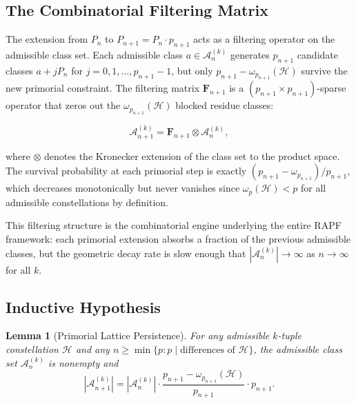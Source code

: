 \documentclass[11pt]{article}
\newtheorem{lemma}[theorem]{Lemma}
\theoremstyle{remark}
\begin{document}
\subsection{The Combinatorial Filtering Matrix}

The extension from $P_n$ to $P_{n+1} = P_n \cdot p_{n+1}$ acts as a
filtering operator on the admissible class set. Each admissible class
$a \in \mathcal{A}_n^{(k)}$ generates $p_{n+1}$ candidate classes
$a + j P_n$ for $j = 0, 1, \ldots, p_{n+1} - 1$, but only
$p_{n+1} - \omega_{p_{n+1}}(\mathcal{H})$ survive the new primorial
constraint. The filtering matrix $\mathbf{F}_{n+1}$ is a
$(p_{n+1} \times p_{n+1})$-sparse operator that zeros out the
$\omega_{p_{n+1}}(\mathcal{H})$ blocked residue classes:

\begin{equation}
\mathcal{A}_{n+1}^{(k)} = \mathbf{F}_{n+1} \otimes
\mathcal{A}_n^{(k)},
\label{eq:filtering}
\end{equation}

where $\otimes$ denotes the Kronecker extension of the class set to the
product space. The survival probability at each primorial step is
exactly $(p_{n+1} - \omega_{p_{n+1}}) / p_{n+1}$, which decreases
monotonically but never vanishes since $\omega_p(\mathcal{H}) < p$ for
all admissible constellations by definition.

This filtering structure is the combinatorial engine underlying the
entire RAPF framework: each primorial extension absorbs a fraction of
the previous admissible classes, but the geometric decay rate is
slow enough that $\left|\mathcal{A}_n^{(k)}\right| \to \infty$ as
$n \to \infty$ for all $k$.

\subsection{Inductive Hypothesis}

\begin{lemma}[Primorial Lattice Persistence]
\label{lem:lattice-persistence}
For any admissible $k$-tuple constellation $\mathcal{H}$ and any
$n \geq \min\{p : p \mid \text{differences of }\mathcal{H}\}$, the
admissible class set $\mathcal{A}_n^{(k)}$ is nonempty and
\begin{equation}
\left|\mathcal{A}_{n+1}^{(k)}\right| =
\left|\mathcal{A}_n^{(k)}\right| \cdot
\frac{p_{n+1} - \omega_{p_{n+1}}(\mathcal{H})}{p_{n+1}} \cdot p_{n+1}.
\end{equation}
\end{lemma}
\end{document}
